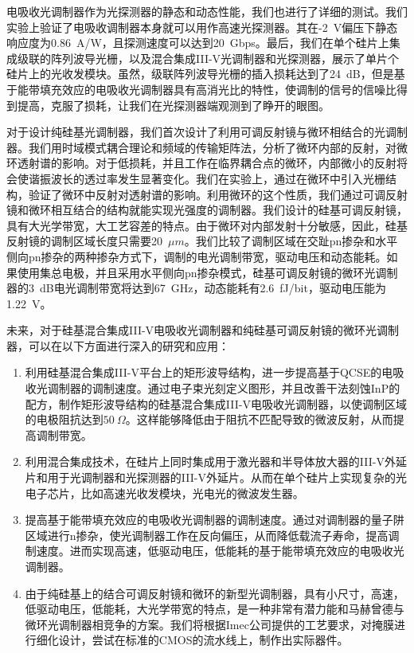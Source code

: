 电吸收光调制器作为光探测器的静态和动态性能，我们也进行了详细的测试。我们实验上验证了电吸收调制器本身就可以用作高速光探测器。其在-2~V偏压下静态响应度为0.86~A/W，且探测速度可以达到20~Gbps。最后，我们在单个硅片上集成级联的阵列波导光栅，以及混合集成III-V光调制器和光探测器，展示了单片个硅片上的光收发模块。虽然，级联阵列波导光栅的插入损耗达到了24~dB，但是基于能带填充效应的电吸收光调制器具有高消光比的特性，使调制的信号的信噪比得到提高，克服了损耗，让我们在光探测器端观测到了睁开的眼图。

对于设计纯硅基光调制器，我们首次设计了利用可调反射镜与微环相结合的光调制器。我们用时域模式耦合理论和频域的传输矩阵法，分析了微环内部的反射，对微环透射谱的影响。对于低损耗，并且工作在临界耦合点的微环，内部微小的反射将会使谐振波长的透过率发生显著变化。我们在实验上，通过在微环中引入光栅结构，验证了微环中反射对透射谱的影响。利用微环的这个性质，我们通过可调反射镜和微环相互结合的结构就能实现光强度的调制器。我们设计的硅基可调反射镜，具有大光学带宽，大工艺容差的特点。由于微环对内部发射十分敏感，因此，硅基反射镜的调制区域长度只需要20~$\mu m$。我们比较了调制区域在交趾pn掺杂和水平侧向pn掺杂的两种掺杂方式下，调制的电光调制带宽，驱动电压和动态能耗。如果使用集总电极，并且采用水平侧向pn掺杂模式，硅基可调反射镜的微环光调制器的3~dB电光调制带宽将达到67~GHz，动态能耗有2.6~fJ/bit，驱动电压能为1.22~V。

未来，对于硅基混合集成III-V电吸收光调制器和纯硅基可调反射镜的微环光调制器，可以在以下方面进行深入的研究和应用：
\begin{enumerate}[(1)]
	\item 利用硅基混合集成III-V平台上的矩形波导结构，进一步提高基于QCSE的电吸收光调制器的调制速度。通过电子束光刻定义图形，并且改善干法刻蚀InP的配方，制作矩形波导结构的硅基混合集成III-V电吸收光调制器，以使调制区域的电极阻抗达到$50~\Omega$。这样能够降低由于阻抗不匹配导致的微波反射，从而提高调制带宽。
	\item 利用混合集成技术，在硅片上同时集成用于激光器和半导体放大器的III-V外延片和用于光调制器和光探测器的III-V外延片。从而在单个硅片上实现复杂的光电子芯片，比如高速光收发模块，光电光的微波发生器。
	\item 提高基于能带填充效应的电吸收光调制器的调制速度。通过对调制器的量子阱区域进行n掺杂，使光调制器工作在反向偏压，从而降低载流子寿命，提高调制速度。进而实现高速，低驱动电压，低能耗的基于能带填充效应的电吸收光调制器。
	\item 由于纯硅基上的结合可调反射镜和微环的新型光调制器，具有小尺寸，高速，低驱动电压，低能耗，大光学带宽的特点，是一种非常有潜力能和马赫曾德与微环光调制器相竞争的方案。我们将根据Imec公司提供的工艺要求，对掩膜进行细化设计，尝试在标准的CMOS的流水线上，制作出实际器件。
\end{enumerate}
